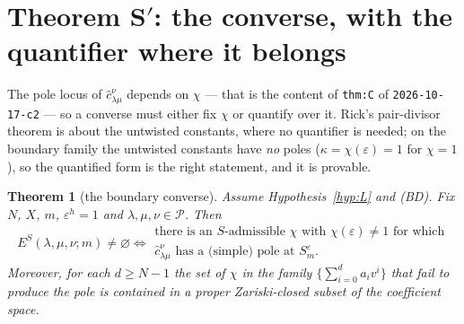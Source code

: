 \documentclass[11pt]{article}
\newtheorem{thm}{Theorem}
\theoremstyle{definition}
\newcommand{\ES}{E^{S}}
\begin{document}
\section{Theorem S$'$: the converse, with the quantifier where it belongs}
\label{sec:quant}

The pole locus of $\hat c^{\nu}_{\lambda\mu}$ depends on $\chi$ --- that is the
content of \texttt{thm:C} of \texttt{2026-10-17-c2} --- so a converse must either
fix $\chi$ or quantify over it.  Rick's pair-divisor theorem is about the
untwisted constants, where no quantifier is needed; on the boundary family the
untwisted constants have \emph{no} poles ($\kappa=\chi(\varepsilon)=1$ for
$\chi=1$), so the quantified form is the right statement, and it is provable.

\begin{thm}[the boundary converse]\label{thm:Sprime}
Assume Hypothesis~\ref{hyp:L} and \textup{(BD)}.  Fix $N$, $X$, $m$,
$\varepsilon^{h}=1$ and $\lambda,\mu,\nu\in\mathcal{P}$.  Then
\[
  \ES(\lambda,\mu,\nu;m)\ne\varnothing
  \iff
  \begin{array}{l}
  \text{there is an $S$-admissible }\chi\text{ with }\chi(\varepsilon)\ne1\text{ for which}\\
  \hat c^{\nu}_{\lambda\mu}\text{ has a (simple) pole at }S_m^{\varepsilon}.
  \end{array}
\]
Moreover, for each $d\ge N-1$ the set of $\chi$ in the family
$\{\sum_{i=0}^{d}a_iv^{i}\}$ that \emph{fail} to produce the pole is contained in
a proper Zariski-closed subset of the coefficient space.
\end{thm}
\end{document}
